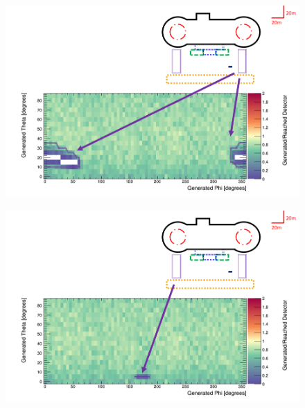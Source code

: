 \begin{figure}[htbp]
 \centering
 \includegraphics[width=\linewidth]{Chapter5/Figs/wylfaRasterNew/steamBridgeCloseGen_Reached.png}
 \label{fig:steamBridgeCloseGen_Reached}
\end{figure}

\begin{figure}[htbp]
 \centering
 \includegraphics[width=\linewidth]{Chapter5/Figs/wylfaRasterNew/steamBridgeFarGen_Reached.png}
 \label{fig:steamBridgeFarGen_Reached}
\end{figure}


